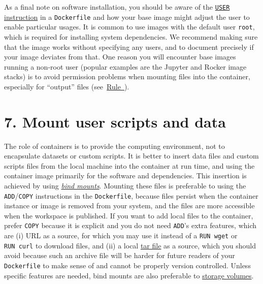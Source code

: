 \documentclass[10pt,letterpaper]{article}
\begin{document}
As a final note on software installation, you should be aware of the
\href{https://docs.docker.com/engine/reference/builder/\#user}{\texttt{USER}
instruction} in a \texttt{Dockerfile} and how your base image might
adjust the user to enable particular usages. It is common to use images
with the default user \texttt{root}, which is required for installing
system dependencies. We recommend making sure that the image works
without specifying any users, and to document precisely if your image
deviates from that. One reason you will encounter base images running a
non-root user (popular examples are the Jupyter and Rocker image stacks)
is to avoid permission problems when mounting files into the container,
especially for ``output'' files
(see~\hyperref[{rule:mount}]{Rule~}).

\hypertarget{mount-user-scripts-and-data}{%
\section*{7. Mount user scripts and
data}\label{mount-user-scripts-and-data}}

  \label{rule:mount} 

The role of containers is to provide the computing environment, not to
encapsulate datasets or custom scripts. It is better to insert data
files and custom scripts files from the local machine into the container
at run time, and using the container image primarily for the software
and dependencies. This insertion is achieved by using
\href{https://docs.docker.com/storage/bind-mounts/}{\emph{bind mounts}}.
Mounting these files is preferable to using the
\texttt{ADD}/\texttt{COPY} instructions in the \texttt{Dockerfile},
because files persist when the container instance or image is removed
from your system, and the files are more accessible when the workspace
is published. If you want to add local files to the container, prefer
\texttt{COPY} because it is explicit and you do not need \texttt{ADD}'s
extra features, which are (i) URL as a source, for which you may use it
instead of a \texttt{RUN\ wget} or \texttt{RUN\ curl} to download files,
and (ii) a local
\href{https://en.wikipedia.org/wiki/Tar_(computing)}{tar file} as a
source, which you should avoid because such an archive file will be
harder for future readers of your \texttt{Dockerfile} to make sense of
and cannot be properly version controlled. Unless specific features are
needed, bind mounts are also preferable to
\href{https://docs.docker.com/storage/volumes/}{storage volumes}.
\end{document}
